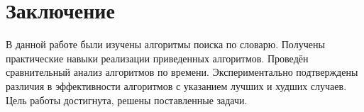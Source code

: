 \chapter*{Заключение}\label{exit}

В данной работе были изучены алгоритмы поиска по словарю. 
Получены практические навыки реализации приведенных алгоритмов. 
Проведён сравнительный анализ алгоритмов по времени. 
Экспериментально подтверждены различия в эффективности алгоритмов с указанием лучших и худших случаев. 
Цель работы достигнута, решены поставленные задачи. 
